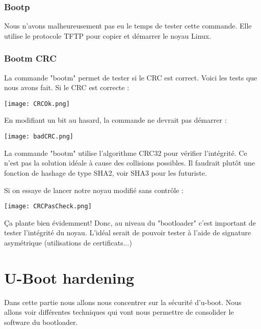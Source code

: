 \subsubsection{Bootp}
Nous n'avons malheureusement pas eu le temps de tester cette commande. Elle utilise le protocole TFTP pour copier et démarrer le noyau Linux.

\pagebreak
\subsubsection{Bootm CRC}

La commande "bootm" permet de tester si le CRC est correct. Voici les tests que nous avons fait. Si le CRC est correcte : 
\begin{center} 
\hspace{15cm}
\texttt{[image: CRCOk.png]}
\end{center}
\vspace{0.5cm}

En modifiant un bit au hasard, la commande ne devrait pas démarrer :
\begin{center} 
\hspace{15cm}
\texttt{[image: badCRC.png]}
\end{center}
\vspace{0.5cm}

La commande "bootm" utilise l'algorithme CRC32 pour vérifier l'intégrité. Ce n'est pas la solution idéale à cause des collisions possibles. Il faudrait plutôt une fonction de hashage de type SHA2, voir SHA3 pour les futuriste.

Si on essaye de lancer notre noyau modifié sans contrôle :
\begin{center} 
\hspace{15cm}
\texttt{[image: CRCPasCheck.png]}
\end{center}
\vspace{0.5cm}

Ça plante bien évidemment! Donc, au niveau du "bootloader" c'est important de tester l'intégrité du noyau. L'idéal serait de pouvoir tester à l'aide de signature asymétrique (utilisations de certificats...)

\pagebreak
\section{U-Boot hardening}

Dans cette partie nous allons nous concentrer sur la sécurité d'u-boot. Nous allons voir différentes techniques qui vont nous permettre de consolider le software du bootloader.

